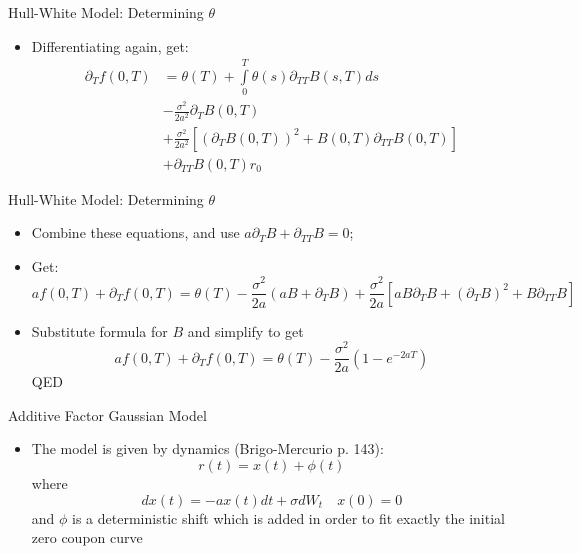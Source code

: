 \documentclass[11pt]{beamer}
\begin{document}
\begin{frame}{Hull-White Model: Determining $\theta$}
\begin{itemize}
\item Differentiating again, get:
\begin{equation}
\begin{split}
\partial_T f(0,T) &= \theta(T) + \int\limits_0^T \theta(s) \partial_{TT} B(s,T) ds  \\
&- \frac{\sigma^2}{2a^2} \partial_T B(0,T) \\ 
&+ \frac{\sigma^2}{2a^2} [(\partial_T B(0,T))^2 + B(0,T) \partial_{TT} B(0,T)] \\
&+ \partial_{TT} B(0,T) r_0 
\end{split}
\end{equation}
\end{itemize}
\end{frame}
\begin{frame}{Hull-White Model: Determining $\theta$}
\begin{itemize}
\item Combine these equations, and use $a \partial_T B + \partial_{TT} B = 0$;
\item Get:
\footnotesize
$$
af(0,T) + \partial_T f(0,T) = \theta(T) - \frac{\sigma^2}{2a} (aB + \partial_T B) +
\frac{\sigma^2}{2a} [aB \partial_T B + (\partial_T B)^2 + B \partial_{TT}B] 
$$
\normalsize
\item Substitute formula for $B$ and simplify to get
$$
af(0,T) + \partial_T f(0,T) = \theta(T) - \frac{\sigma^2}{2a} (1 - e^{-2aT})
$$
QED
\end{itemize}
\end{frame}
\begin{frame}{Additive Factor Gaussian Model}
\begin{itemize}
\item The model is given by dynamics (Brigo-Mercurio p. 143):
$$r(t) = x(t) + \phi(t)$$
where
$$dx(t) = - a x(t)dt+\sigma dW_t \quad x(0)=0$$
and $\phi$ is a deterministic shift which is added in order to fit exactly the initial zero coupon curve
\end{itemize}
\end{frame}
\end{document}
